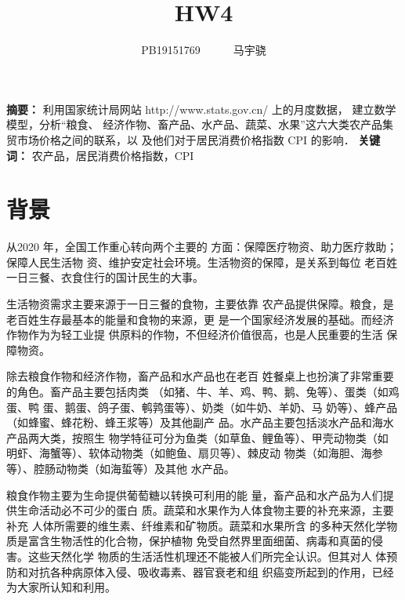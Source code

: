 \documentclass[a4paper,AutoFakeBold,AutoFakeSlant]{ctexart}
\title{\textbf{\textsf{{\textsf{HW4} \heiti{数学建模报告}}}}}
\author{\ssong PB19151769~~~~~~马宇骁}
\date{}
\makeatletter
\renewcommand{\abstractname}{}    %
\renewenvironment{abstract}{%
      \if@twocolumn
        \section*{\abstractname}%
      \else
        \small
        \begin{center}%
          {\bfseries \abstractname\vspace{-.5em}\vspace{\z@}}%
        \end{center}%
      \fi}
      {}
\makeatother
\begin{document}
\maketitle


\begin{abstract} \kaishu
\noindent
\textbf{\heiti 摘要：} 利用国家统计局网站 http://www.stats.gov.cn/ 上的月度数据，
建立数学模型，分析“粮食、
经济作物、畜产品、水产品、蔬菜、水果”这六大类农产品集贸市场价格之间的联系，以
及他们对于居民消费价格指数 CPI 的影响．
\newline
\textbf{\heiti 关键词：} 农产品，居民消费价格指数，CPI
\end{abstract}

\section{背景}
从2020 年，全国工作重心转向两个主要的
方面：保障医疗物资、助力医疗救助；保障人民生活物
资、维护安定社会环境。生活物资的保障，是关系到每位
老百姓一日三餐、衣食住行的国计民生的大事。\cite{何叶20202020}

生活物资需求主要来源于一日三餐的食物，主要依靠
农产品提供保障。粮食，是老百姓生存最基本的能量和食物的来源，更
是一个国家经济发展的基础。而经济作物作为为轻工业提
供原料的作物，不但经济价值很高，也是人民重要的生活
保障物资。

除去粮食作物和经济作物，畜产品和水产品也在老百
姓餐桌上也扮演了非常重要的角色。畜产品主要包括肉类
（如猪、牛、羊、鸡、鸭、鹅、兔等）、蛋类（如鸡蛋、鸭
蛋、鹅蛋、鸽子蛋、鹌鹑蛋等）、奶类（如牛奶、羊奶、马
奶等）、蜂产品（如蜂蜜、蜂花粉、蜂王浆等）及其他副产
品。水产品主要包括淡水产品和海水产品两大类，按照生
物学特征可分为鱼类（如草鱼、鲤鱼等）、甲壳动物类（如
明虾、海蟹等）、软体动物类（如鲍鱼、扇贝等）、棘皮动
物类（如海胆、海参等）、腔肠动物类（如海蜇等）及其他
水产品。

粮食作物主要为生命提供葡萄糖以转换可利用的能
量，畜产品和水产品为人们提供生命活动必不可少的蛋白
质。蔬菜和水果作为人体食物主要的补充来源，主要补充
人体所需要的维生素、纤维素和矿物质。蔬菜和水果所含
的多种天然化学物质是富含生物活性的化合物，保护植物
免受自然界里面细菌、病毒和真菌的侵害。这些天然化学
物质的生活活性机理还不能被人们所完全认识。但其对人
体预防和对抗各种病原体入侵、吸收毒素、器官衰老和组
织癌变所起到的作用，已经为大家所认知和利用。
\end{document}
